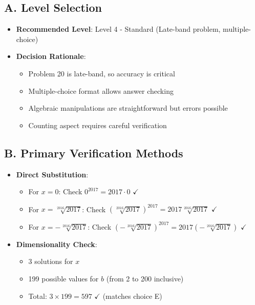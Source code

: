 \documentclass[]{article}
\begin{document}
\begin{verificationbox}
\subsection*{A. Level Selection}
\begin{itemize}[leftmargin=*]
    \item \textbf{Recommended Level}: Level 4 - Standard (Late-band problem, multiple-choice)
    
    \item \textbf{Decision Rationale}:
    \begin{itemize}
        \item Problem 20 is late-band, so accuracy is critical
        \item Multiple-choice format allows answer checking
        \item Algebraic manipulations are straightforward but errors possible
        \item Counting aspect requires careful verification
    \end{itemize}
\end{itemize}

\subsection*{B. Primary Verification Methods}
\begin{itemize}[leftmargin=*]
    \item \textbf{Direct Substitution}: 
    \begin{itemize}
        \item For $x=0$: Check $0^{2017} = 2017 \cdot 0$ $\checkmark$
        \item For $x=\sqrt[2016]{2017}$: Check $(\sqrt[2016]{2017})^{2017} = 2017\sqrt[2016]{2017}$ $\checkmark$
        \item For $x=-\sqrt[2016]{2017}$: Check $(-\sqrt[2016]{2017})^{2017} = 2017(-\sqrt[2016]{2017})$ $\checkmark$
    \end{itemize}
    
    \item \textbf{Dimensionality Check}: 
    \begin{itemize}
        \item 3 solutions for $x$
        \item 199 possible values for $b$ (from 2 to 200 inclusive)
        \item Total: $3 \times 199 = 597$ $\checkmark$ (matches choice E)
    \end{itemize}
    

\end{itemize}
\end{verificationbox}
\end{document}
